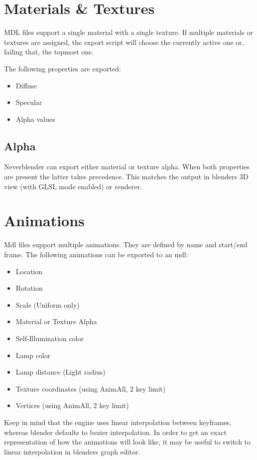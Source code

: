 \section{Materials \& Textures}
MDL files support a single material with a single texture. If multiple 
materials or textures are assigned, the export script will choose the currently 
active one or, failing that, the topmost one.

The following properties are exported:
\begin{itemize}
    \item Diffuse
    \item Specular
    \item Alpha values
\end{itemize}

\subsection*{Alpha}
Neverblender can export either material or texture alpha. When both properties are present 
the latter takes precedence. This matches the output in blenders 3D view (with GLSL mode enabled) 
or renderer.

\section{Animations}
Mdl files support multiple animations. They are defined by name and start/end frame.
The following animations can be exported to an mdl:
\begin{itemize}
    \item Location
    \item Rotation
    \item Scale (Uniform only)
    \item Material or Texture Alpha
    \item Self-Illumination color
    \item Lamp color
    \item Lamp distance (Light radius)
    \item Texture coordinates (using AnimAll, 2 key limit)
    \item Vertices (using AnimAll, 2 key limit)
\end{itemize}
Keep in mind that the engine uses linear interpolation between keyframes, whereas blender 
defaults to bezier interpolation. In order to get an exact representation of how the animations will 
look like, it may be useful to switch to linear interpolation in blenders graph editor.

